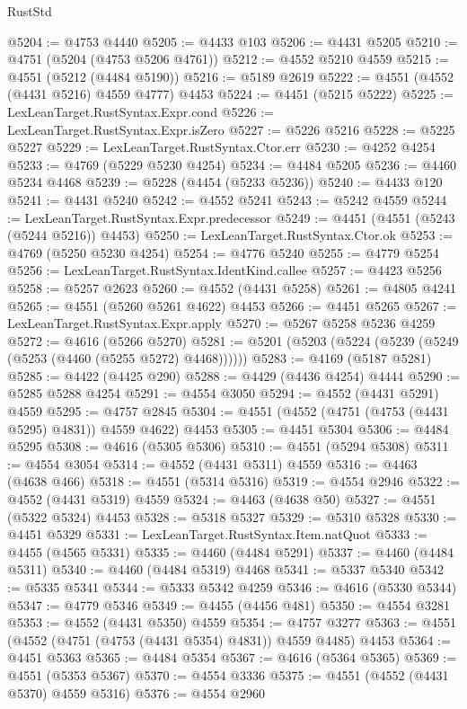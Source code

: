 \begin{lexlean}{RustStd}
\begin{coremodule}
@5204 := @4753 @4440
@5205 := @4433 @103
@5206 := @4431 @5205
@5210 := @4751 (@5204 (@4753 @5206 @4761))
@5212 := @4552 @5210 @4559
@5215 := @4551 (@5212 (@4484 @5190))
@5216 := @5189 @2619
@5222 := @4551 (@4552 (@4431 @5216) @4559 @4777) @4453
@5224 := @4451 (@5215 @5222)
@5225 := LexLeanTarget.RustSyntax.Expr.cond
@5226 := LexLeanTarget.RustSyntax.Expr.isZero
@5227 := @5226 @5216
@5228 := @5225 @5227
@5229 := LexLeanTarget.RustSyntax.Ctor.err
@5230 := @4252 @4254
@5233 := @4769 (@5229 @5230 @4254)
@5234 := @4484 @5205
@5236 := @4460 @5234 @4468
@5239 := @5228 (@4454 (@5233 @5236))
@5240 := @4433 @120
@5241 := @4431 @5240
@5242 := @4552 @5241
@5243 := @5242 @4559
@5244 := LexLeanTarget.RustSyntax.Expr.predecessor
@5249 := @4451 (@4551 (@5243 (@5244 @5216)) @4453)
@5250 := LexLeanTarget.RustSyntax.Ctor.ok
@5253 := @4769 (@5250 @5230 @4254)
@5254 := @4776 @5240
@5255 := @4779 @5254
@5256 := LexLeanTarget.RustSyntax.IdentKind.callee
@5257 := @4423 @5256
@5258 := @5257 @2623
@5260 := @4552 (@4431 @5258)
@5261 := @4805 @4241
@5265 := @4551 (@5260 @5261 @4622) @4453
@5266 := @4451 @5265
@5267 := LexLeanTarget.RustSyntax.Expr.apply
@5270 := @5267 @5258 @5236 @4259
@5272 := @4616 (@5266 @5270)
@5281 := @5201 (@5203 (@5224 (@5239 (@5249 (@5253 (@4460 (@5255 @5272) @4468))))))
@5283 := @4169 (@5187 @5281)
@5285 := @4422 (@4425 @290)
@5288 := @4429 (@4436 @4254) @4444
@5290 := @5285 @5288 @4254
@5291 := @4554 @3050
@5294 := @4552 (@4431 @5291) @4559
@5295 := @4757 @2845
@5304 := @4551 (@4552 (@4751 (@4753 (@4431 @5295) @4831)) @4559 @4622) @4453
@5305 := @4451 @5304
@5306 := @4484 @5295
@5308 := @4616 (@5305 @5306)
@5310 := @4551 (@5294 @5308)
@5311 := @4554 @3054
@5314 := @4552 (@4431 @5311) @4559
@5316 := @4463 (@4638 @466)
@5318 := @4551 (@5314 @5316)
@5319 := @4554 @2946
@5322 := @4552 (@4431 @5319) @4559
@5324 := @4463 (@4638 @50)
@5327 := @4551 (@5322 @5324) @4453
@5328 := @5318 @5327
@5329 := @5310 @5328
@5330 := @4451 @5329
@5331 := LexLeanTarget.RustSyntax.Item.natQuot
@5333 := @4455 (@4565 @5331)
@5335 := @4460 (@4484 @5291)
@5337 := @4460 (@4484 @5311)
@5340 := @4460 (@4484 @5319) @4468
@5341 := @5337 @5340
@5342 := @5335 @5341
@5344 := @5333 @5342 @4259
@5346 := @4616 (@5330 @5344)
@5347 := @4779 @5346
@5349 := @4455 (@4456 @481)
@5350 := @4554 @3281
@5353 := @4552 (@4431 @5350) @4559
@5354 := @4757 @3277
@5363 := @4551 (@4552 (@4751 (@4753 (@4431 @5354) @4831)) @4559 @4485) @4453
@5364 := @4451 @5363
@5365 := @4484 @5354
@5367 := @4616 (@5364 @5365)
@5369 := @4551 (@5353 @5367)
@5370 := @4554 @3336
@5375 := @4551 (@4552 (@4431 @5370) @4559 @5316)
@5376 := @4554 @2960

\end{coremodule}
\end{lexlean}
